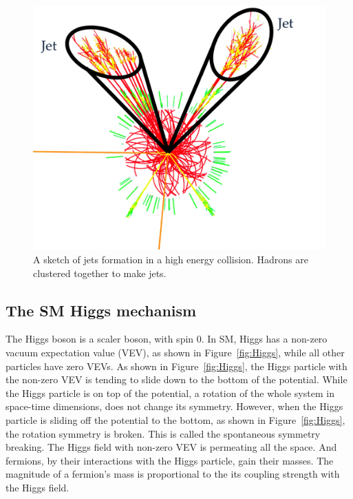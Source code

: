 \begin{figure}[!htbp]
\centering
\includegraphics[width=.7\textwidth]{figures/clustering.png}
\caption{A sketch of jets formation in a high energy collision. Hadrons are clustered
together to make jets.}
\label{fig:jet_formation}
\end{figure}  



\subsection{The SM Higgs mechanism}

The Higgs boson is a scaler boson, with spin 0. In SM, Higgs has a non-zero vacuum expectation
value (VEV), as shown in Figure~\ref{fig:Higgs}, while all other particles have zero VEVs. 
As shown in Figure~\ref{fig:Higgs}, the Higgs particle with the non-zero VEV is tending to slide down to the bottom of the potential. While the Higgs particle is on top of the potential, a rotation of the whole system in space-time dimensions, does not change its symmetry. However, when the Higgs particle is sliding off the potential to the bottom, as shown in Figure~\ref{fig:Higgs}, the rotation symmetry is broken. This is called the spontaneous symmetry breaking.  
The Higgs field with non-zero VEV is permeating all the space. And fermions, by their interactions with the Higgs particle, gain their masses. The magnitude of a fermion's mass is proportional to the its coupling strength with the Higgs field.

